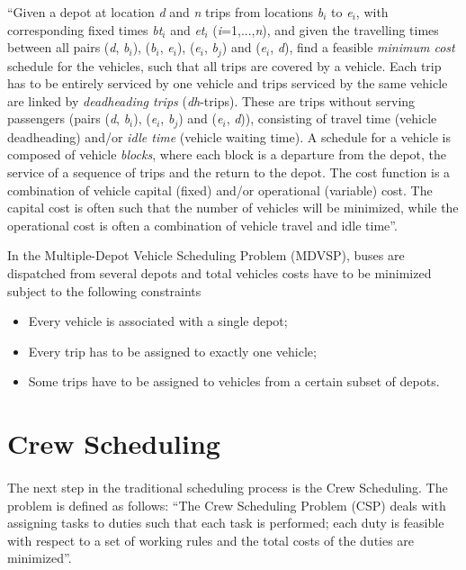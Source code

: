 \documentclass[12pt, oneside]{report}
\begin{document}
“Given a depot at location \textit{d} and \textit{n} trips from locations \textit{b}$_i$ to \textit{e}$_i$, with corresponding fixed times \textit{bt}$_i$ and \textit{et}$_i$ (\textit{i}=1,...,\textit{n}),  and  given  the  travelling  times  between  all  pairs (\textit{d}, \textit{b}$_i$), (\textit{b}$_i$, \textit{e}$_i$), (\textit{e}$_i$, \textit{b}$_j$) and (\textit{e}$_i$, \textit{d}), find a feasible \textit{minimum cost} schedule for the vehicles, such that all trips are covered by a vehicle. Each trip has to be entirely serviced by one vehicle and trips serviced by the same vehicle are linked by \textit{deadheading trips} (\textit{dh}-trips).  These are trips without serving passengers (pairs (\textit{d}, \textit{b}$_i$), (\textit{e}$_i$, \textit{b}$_j$) and (\textit{e}$_i$, \textit{d})), consisting of travel time (vehicle deadheading) and/or \textit{idle time} (vehicle waiting time). A schedule for a vehicle is composed of vehicle \textit{blocks}, where each block is a departure from the depot, the service of a sequence of trips and the return to the depot. The cost function is a combination of vehicle capital (fixed) and/or operational (variable) cost. The capital cost is often such that the number of vehicles will be minimized, while the operational cost is often a combination of vehicle travel and idle time”.

In the Multiple-Depot Vehicle Scheduling Problem (MDVSP), buses are dispatched from several depots and total vehicles costs have to be minimized subject to the following constraints \citep{Huisman2004}

\begin {itemize}
\item Every vehicle is associated with a single depot; 
\item Every trip has to be assigned to exactly one vehicle; 
\item Some trips have to be assigned to vehicles from a certain subset of depots.
\end {itemize}

\section {Crew Scheduling}

\paragraph{ } The next step in the traditional scheduling process is the Crew Scheduling.  The problem is defined as follows: “The Crew Scheduling Problem (CSP) deals with assigning tasks to duties such that each task is performed; each duty is feasible with respect to a set of working rules and the total costs of the duties are minimized”. 
\end{document}
